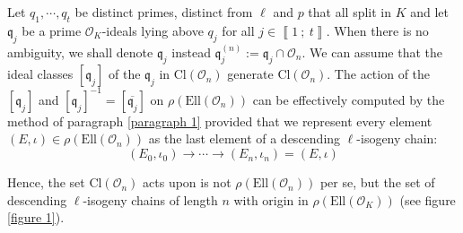 \documentclass[a4paper,10pt]{report}
\theoremstyle{definition}
\theoremstyle{plain}
\theoremstyle{definition}
\newcommand{\mO}{\mathcal{O}}
\renewcommand{\i}[2]{\left\llbracket #1~;~#2\right\rrbracket}
\renewcommand{\(}{\left(}
\renewcommand{\)}{\right)}
\newcommand{\mfq}{\mathfrak{q}}
\begin{document}
Let $q_1, \cdots,q_t$ be distinct primes, distinct from $\ell$ and $p$ that all split in $K$ and let $\mfq_j$ be a prime $\mO_K$-ideals lying above $q_j$ for all $j\in\i{1}{t}$.  When there is no ambiguity, we shall denote $\mfq_j$ instead $\mfq_j^{(n)}:=\mfq_j\cap\mO_n$.  We can assume that the ideal classes $[\mfq_j]$ of the $\mfq_j$ in $\mbox{Cl}(\mO_n)$ generate $\mbox{Cl}(\mO_n)$.  The action of the $[\mfq_j]$ and $[\mfq_j]^{-1}=[\overline{\mfq_j}]$ on $\rho(\mbox{Ell}(\mO_n))$ can be effectively computed by the method of paragraph \ref{paragraph 1} provided that we represent every element $(E,\iota)\in\rho(\mbox{Ell}(\mO_n))$ as the last element of a descending $\ell$-isogeny chain:
\[(E_0,\iota_0)\longrightarrow\cdots\longrightarrow (E_n,\iota_n)=(E,\iota)\]

Hence, the set $\mbox{Cl}(\mO_n)$ acts upon is not $\rho(\mbox{Ell}(\mO_n))$ per se, but the set of  descending $\ell$-isogeny chains of length $n$ with origin in $\rho(\mbox{Ell}(\mO_K))$ (see figure \ref{figure 1}).

\end{document}
